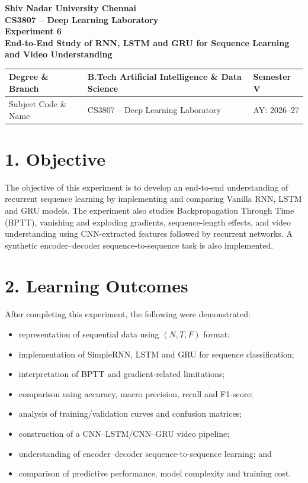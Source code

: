 \documentclass[10pt]{article}
\begin{document}
\begin{center}
{\large\textbf{Shiv Nadar University Chennai}}\\[2mm]
{\normalsize\textbf{CS3807 -- Deep Learning Laboratory}}\\[2mm]
{\large\textbf{Experiment 6}}\\[1mm]
{\normalsize\textbf{End-to-End Study of RNN, LSTM and GRU for Sequence Learning and Video Understanding}}
\end{center}

\vspace{3mm}
\begin{tabular}{|p{3.4cm}|p{9.0cm}|p{1.4cm}|}\hline
Degree \& Branch & B.Tech Artificial Intelligence \& Data Science & Semester V\\\hline
Subject Code \& Name & CS3807 -- Deep Learning Laboratory & AY: 2026--27\\\hline
\end{tabular}

\section*{1. Objective}
The objective of this experiment is to develop an end-to-end understanding of recurrent sequence learning by implementing and comparing Vanilla RNN, LSTM and GRU models. The experiment also studies Backpropagation Through Time (BPTT), vanishing and exploding gradients, sequence-length effects, and video understanding using CNN-extracted features followed by recurrent networks. A synthetic encoder--decoder sequence-to-sequence task is also implemented.

\section*{2. Learning Outcomes}
After completing this experiment, the following were demonstrated:
\begin{itemize}
\item representation of sequential data using $(N,T,F)$ format;
\item implementation of SimpleRNN, LSTM and GRU for sequence classification;
\item interpretation of BPTT and gradient-related limitations;
\item comparison using accuracy, macro precision, recall and F1-score;
\item analysis of training/validation curves and confusion matrices;
\item construction of a CNN--LSTM/CNN--GRU video pipeline;
\item understanding of encoder--decoder sequence-to-sequence learning; and
\item comparison of predictive performance, model complexity and training cost.
\end{itemize}
\end{document}
